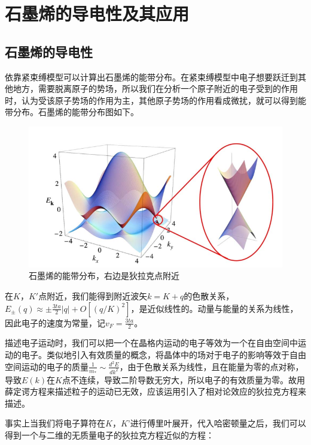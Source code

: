 
\chapter{石墨烯的导电性及其应用}
\section{石墨烯的导电性}


依靠紧束缚模型可以计算出石墨烯的能带分布。在紧束缚模型中电子想要跃迁到其他地方，需要脱离原子的势场，所以我们在分析一个原子附近的电子受到的作用时，认为受该原子势场的作用为主，其他原子势场的作用看成微扰，就可以得到能带分布。石墨烯的能带分布图如下。

\begin{figure}[H]
  \centering
  \includegraphics[scale=0.8]{img/石墨烯的能带分布，右边是狄拉克点附近.png}
  \caption{石墨烯的能带分布，右边是狄拉克点附近}
  \label{fig:grapheneDiracPoint}
\end{figure}

在$K$，$K'$点附近，我们能得到附近波矢$k=K+q$的色散关系，$E_{\pm} (q)\approx \pm \frac{3ta}{2} \left | q \right | + O\left [(q/K)^{2}  \right ]$，是近似线性的。动量与能量的关系为线性，因此电子的速度为常量，记$v_F=\frac{3ta}{2}$。

描述电子运动时，我们可以把一个在晶格内运动的电子等效为一个在自由空间中运动的电子。类似地引入有效质量的概念，将晶体中的场对于电子的影响等效于自由空间运动的电子的质量$\frac{1}{m_*}\sim \frac{d^{2}E}{dk^2}$，由于色散关系为线性，且在能量为零的点对称，导致$E(k)$在$K$点不连续，导致二阶导数无穷大，所以电子的有效质量为零。故用薛定谔方程来描述粒子的运动已无效，应该运用引入了相对论效应的狄拉克方程来描述。

事实上当我们将电子算符在$K$，$K’$进行傅里叶展开，代入哈密顿量之后，我们可以得到一个与二维的无质量电子的狄拉克方程近似的方程：

